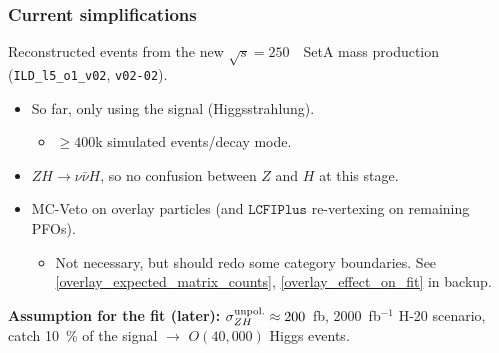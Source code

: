 
\begin{frame}
  \frametitle{Current simplifications}

  Reconstructed events from the new $\sqrt{s} = 250$~\GeV~SetA mass production (\texttt{ILD\_l5\_o1\_v02}, \texttt{v02-02}).
  \begin{itemize}
    \item So far, only using the signal (Higgsstrahlung).
    \begin{itemize}
      \item $\geq 400$k simulated events/decay mode.
     \end{itemize}
    \item $ZH \rightarrow \nu \bar{\nu}H$, so no confusion between $Z$ and $H$ at this stage.
    \item MC-Veto on overlay particles (and $\texttt{LCFIPlus}$ re-vertexing on remaining PFOs).
    \begin{itemize}
      \item Not necessary, but should redo some category boundaries.
            See {\color{llblue}\ref{overlay_expected_matrix_counts}},
            {\color{llblue}\ref{overlay_effect_on_fit}} in backup.
     \end{itemize}
  \end{itemize}
  \textbf{Assumption for the fit (later):}
  $\sigma_{ZH}^{\textnormal{unpol.}} \approx 200$~fb, 2000~fb$^{-1}$ H-20 scenario, \\
  catch 10~\% of the signal $\rightarrow$ $O(40,000)$ Higgs events.

  \end{frame}
